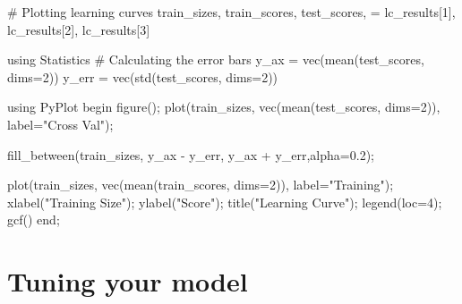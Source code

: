 \documentclass[
  letterpaper,
]{book}
\newenvironment{Shaded}{\begin{snugshade}}{\end{snugshade}}
\newcommand{\BuiltInTok}[1]{\textcolor[rgb]{0.00,0.23,0.31}{#1}}
\newcommand{\CommentTok}[1]{\textcolor[rgb]{0.37,0.37,0.37}{#1}}
\newcommand{\ControlFlowTok}[1]{\textcolor[rgb]{0.00,0.23,0.31}{#1}}
\newcommand{\FloatTok}[1]{\textcolor[rgb]{0.68,0.00,0.00}{#1}}
\newcommand{\FunctionTok}[1]{\textcolor[rgb]{0.28,0.35,0.67}{#1}}
\newcommand{\ImportTok}[1]{\textcolor[rgb]{0.00,0.46,0.62}{#1}}
\newcommand{\NormalTok}[1]{\textcolor[rgb]{0.00,0.23,0.31}{#1}}
\newcommand{\OperatorTok}[1]{\textcolor[rgb]{0.37,0.37,0.37}{#1}}
\newcommand{\StringTok}[1]{\textcolor[rgb]{0.13,0.47,0.30}{#1}}
\begin{document}
\begin{Shaded}
\begin{Highlighting}[]
\CommentTok{\# Plotting learning curves}
\NormalTok{train\_sizes, train\_scores, test\_scores, }\OperatorTok{=} 
\NormalTok{    lc\_results[}\FloatTok{1}\NormalTok{], lc\_results[}\FloatTok{2}\NormalTok{], lc\_results[}\FloatTok{3}\NormalTok{]}

\ImportTok{using} \BuiltInTok{Statistics}
\CommentTok{\# Calculating the error bars }
\NormalTok{y\_ax }\OperatorTok{=} \FunctionTok{vec}\NormalTok{(}\FunctionTok{mean}\NormalTok{(test\_scores, dims}\OperatorTok{=}\FloatTok{2}\NormalTok{)) }
\NormalTok{y\_err }\OperatorTok{=} \FunctionTok{vec}\NormalTok{(}\FunctionTok{std}\NormalTok{(test\_scores, dims}\OperatorTok{=}\FloatTok{2}\NormalTok{))}

\ImportTok{using} \BuiltInTok{PyPlot}
\ControlFlowTok{begin} 
    \FunctionTok{figure}\NormalTok{();}
    \FunctionTok{plot}\NormalTok{(train\_sizes,}
        \FunctionTok{vec}\NormalTok{(}\FunctionTok{mean}\NormalTok{(test\_scores, dims}\OperatorTok{=}\FloatTok{2}\NormalTok{)), label}\OperatorTok{=}\StringTok{"Cross Val"}\NormalTok{);}

    \FunctionTok{fill\_between}\NormalTok{(train\_sizes,}
\NormalTok{        y\_ax }\OperatorTok{{-}}\NormalTok{ y\_err, y\_ax }\OperatorTok{+}\NormalTok{ y\_err,alpha}\OperatorTok{=}\FloatTok{0.2}\NormalTok{);}

    \FunctionTok{plot}\NormalTok{(train\_sizes,}
        \FunctionTok{vec}\NormalTok{(}\FunctionTok{mean}\NormalTok{(train\_scores, dims}\OperatorTok{=}\FloatTok{2}\NormalTok{)), label}\OperatorTok{=}\StringTok{"Training"}\NormalTok{);}
    \FunctionTok{xlabel}\NormalTok{(}\StringTok{"Training Size"}\NormalTok{); }
    \FunctionTok{ylabel}\NormalTok{(}\StringTok{"Score"}\NormalTok{); }
    \FunctionTok{title}\NormalTok{(}\StringTok{"Learning Curve"}\NormalTok{);}
    \FunctionTok{legend}\NormalTok{(loc}\OperatorTok{=}\FloatTok{4}\NormalTok{);}
    \FunctionTok{gcf}\NormalTok{()}
\ControlFlowTok{end}\NormalTok{;}
\end{Highlighting}
\end{Shaded}

\hypertarget{tuning-your-model}{%
\chapter{Tuning your model}\label{tuning-your-model}}
\end{document}
